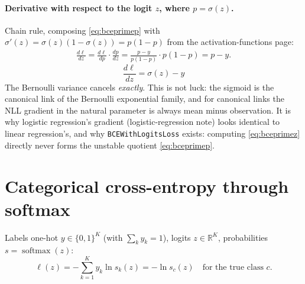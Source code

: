 \documentclass[11pt]{article}
\begin{document}
\paragraph{Derivative with respect to the logit $z$, where
$p = \sigma(z)$.} Chain rule, composing \eqref{eq:bceprimep} with
$\sigma'(z) = \sigma(z)(1 - \sigma(z)) = p(1-p)$ from the
activation-functions page:
\begin{align*}
  \frac{d\ell}{dz}
  = \frac{d\ell}{dp}\cdot\frac{dp}{dz}
  = \frac{p - y}{p(1-p)} \cdot p(1-p)
  = p - y.
\end{align*}
\begin{equation}
  \boxed{\;\frac{d\ell}{dz} = \sigma(z) - y\;}
  \label{eq:bceprimez}
\end{equation}
The Bernoulli variance cancels \emph{exactly}. This is not luck: the
sigmoid is the canonical link of the Bernoulli exponential family, and
for canonical links the NLL gradient in the natural parameter is always
mean minus observation. It is why logistic regression's gradient
(logistic-regression note) looks identical to linear regression's, and
why \texttt{BCEWithLogitsLoss} exists: computing
\eqref{eq:bceprimez} directly never forms the unstable quotient
\eqref{eq:bceprimep}.

\section{Categorical cross-entropy through softmax}

Labels one-hot $y \in \{0,1\}^{K}$ (with $\sum_k y_k = 1$), logits
$z \in \mathbb{R}^{K}$, probabilities $s = \operatorname{softmax}(z)$:
\begin{equation}
  \ell(z) = -\sum_{k=1}^{K} y_k \ln s_k(z) = -\ln s_c(z)
  \quad\text{for the true class } c.
  \label{eq:ce}
\end{equation}
\end{document}
